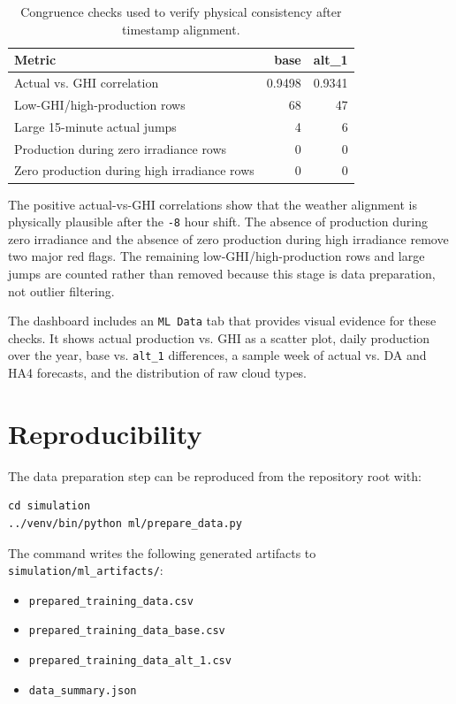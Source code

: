\documentclass[paper=a4, fontsize=11pt]{scrartcl}
\numberwithin{table}{section}
\begin{document}
\begin{table}[h]
\centering
\begin{tabular}{lrr}
\toprule
\textbf{Metric} & \textbf{base} & \textbf{alt\_1} \\
\midrule
Actual vs. GHI correlation & 0.9498 & 0.9341 \\
Low-GHI/high-production rows & 68 & 47 \\
Large 15-minute actual jumps & 4 & 6 \\
Production during zero irradiance rows & 0 & 0 \\
Zero production during high irradiance rows & 0 & 0 \\
\bottomrule
\end{tabular}
\caption{Congruence checks used to verify physical consistency after timestamp alignment.}
\end{table}

The positive actual-vs-GHI correlations show that the weather alignment is
physically plausible after the \texttt{-8} hour shift. The absence of production
during zero irradiance and the absence of zero production during high irradiance
remove two major red flags. The remaining low-GHI/high-production rows and large
jumps are counted rather than removed because this stage is data preparation,
not outlier filtering.

The dashboard includes an \texttt{ML Data} tab that provides visual evidence for
these checks. It shows actual production vs. GHI as a scatter plot, daily
production over the year, base vs. \texttt{alt\_1} differences, a sample week of
actual vs. DA and HA4 forecasts, and the distribution of raw cloud types.

\section{Reproducibility}

The data preparation step can be reproduced from the repository root with:

\begin{verbatim}
cd simulation
../venv/bin/python ml/prepare_data.py
\end{verbatim}

The command writes the following generated artifacts to
\texttt{simulation/ml\_artifacts/}:

\begin{itemize}
    \item \texttt{prepared\_training\_data.csv}
    \item \texttt{prepared\_training\_data\_base.csv}
    \item \texttt{prepared\_training\_data\_alt\_1.csv}
    \item \texttt{data\_summary.json}
\end{itemize}
\end{document}
